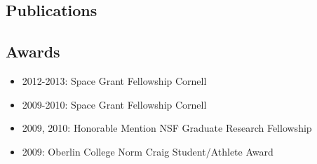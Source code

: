 \documentclass[11pt, oneside]{article}   	%
\begin{document}
\vspace{-0.2in}
\subsection*{Publications}
\nocite{schlawin2018JWSTforecasts}
\nocite{schlawin2014}
\nocite{schlawin2017dhs}
\nocite{schlawin2017bdVar}
\nocite{greene2017jatisNIRCam}
\nocite{greene2016slitlessGrisms}
\nocite{schlawin2016kic1255}
\nocite{schlawin2010}
\nocite{schlawin2016kic1255}
\nocite{schlawin2014TSpec}
\nocite{muirheadKOI961}
\nocite{dale2009spitzerAnthology}
\nocite{west2011sloanMdwarf}
\nocite{muirhead2012}
\nocite{johnson2012}
\nocite{muirheadKOI961}
\nocite{muirhead2014coolKOIIV}

\begingroup
\renewcommand{\section}[2]{}%


\endgroup

%
%

\vspace{-0.15in}
\subsection*{Awards}
\begin{itemize}[noitemsep]
        \item 2012-2013: Space Grant Fellowship Cornell
        \item 2009-2010: Space Grant Fellowship Cornell
        \item 2009, 2010: Honorable Mention NSF Graduate Research Fellowship 
        \item 2009: Oberlin College Norm Craig Student/Athlete Award
\end{itemize}
\end{document}
